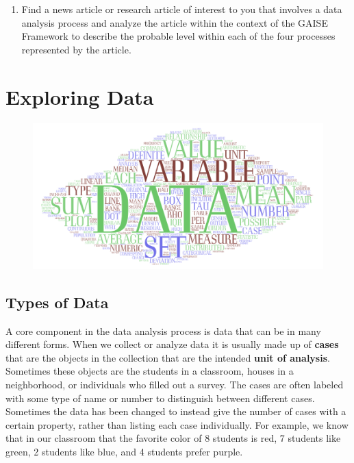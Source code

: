 \documentclass[
]{book}
\providecommand{\tightlist}{%
  \setlength{\itemsep}{0pt}\setlength{\parskip}{0pt}}
\let\stdsection\section
\renewcommand\section{\newpage\stdsection}
\theoremstyle{definition}
\theoremstyle{definition}
\theoremstyle{definition}
\theoremstyle{definition}
\theoremstyle{remark}
\begin{document}
\begin{enumerate}
  \begin{enumerate}
  \def\labelenumii{\alph{enumii}.}
  \tightlist
  \item
    From 2017-2019 the information about fatal police shootings\footnote{\url{https://www.statista.com/statistics/585152/people-shot-to-death-by-us-police-by-race/} retrieved August 1, 2020} indicated that 1,226 white people, 667 black people, and 485 Hispanic people were fatally shot by police. A person concludes that a white person is more likely to be fatally shot by police than a black person.
  \end{enumerate}
\item
  Find a news article or research article of interest to you that involves a data analysis process and analyze the article within the context of the GAISE Framework to describe the probable level within each of the four processes represented by the article.
\end{enumerate}

\hypertarget{data-explore}{%
\chapter{Exploring Data}\label{data-explore}}

\begin{figure}

{\centering \includegraphics[width=0.9\linewidth]{images/DataWordArt} 

}

\end{figure}

\hypertarget{types-of-data}{%
\section{Types of Data}\label{types-of-data}}

A core component in the data analysis process is data that can be in many different forms. When we collect or analyze data it is usually made up of \textbf{cases} that are the objects in the collection that are the intended \textbf{unit of analysis}. Sometimes these objects are the students in a classroom, houses in a neighborhood, or individuals who filled out a survey. The cases are often labeled with some type of name or number to distinguish between different cases. Sometimes the data has been changed to instead give the number of cases with a certain property, rather than listing each case individually. For example, we know that in our classroom that the favorite color of 8 students is red, 7 students like green, 2 students like blue, and 4 students prefer purple.
\end{document}

